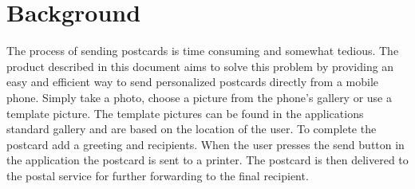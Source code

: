 \documentclass[10pt,a4paper]{article}
\begin{document}
\section{Background}
The process of sending postcards is time consuming and somewhat tedious. The product described in this document aims to solve this problem by providing an easy and efficient way to send personalized postcards directly from a mobile phone. Simply take a photo, choose a picture from the phone's gallery or use a template picture. The template pictures can be found in the applications standard gallery and are based on the location of the user. To complete the postcard add a greeting and recipients. When the user presses the send button in the application the postcard is sent to a printer. The postcard is then delivered to the postal service for further forwarding to the final recipient. 

%
%

\end{document}

